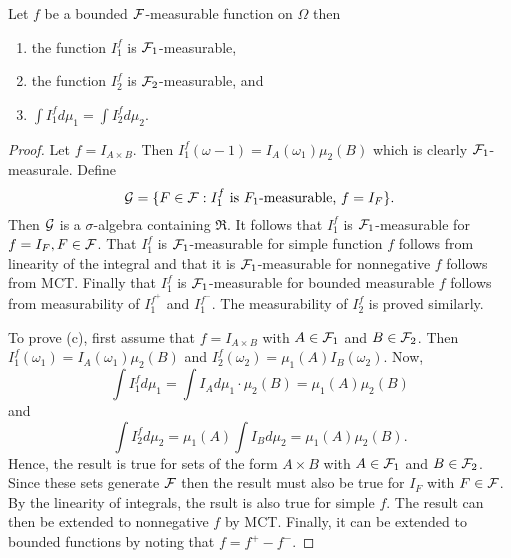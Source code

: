 \begin{lemma}
Let $f$ be a bounded $\mathcal F$-measurable function on $\Omega$ then 
\begin{enumerate}
\item the function $I_1^f$ is $\mathcal F_1$-measurable,
\item the function $I_2^f$ is $\mathcal F_2$-measurable, and
\item $\int I_1^f d\mu_1=\int I_2^f d\mu_2$.
\end{enumerate}
\end{lemma}




\begin{proof}
Let $f=I_{A\times B}$. Then $I_1^f(\omega-1)=I_A(\omega_1)\mu_2(B)$ which is clearly $\mathcal F_1$-measurale. Define
\begin{equation*}
\G=\{F\in\F: I_1^f\ \text{is}\ F_1\text{-measurable,}\ f=I_F \}.
\end{equation*}
Then $\mathcal G$ is a $\sigma$-algebra containing $\Re$. It follows that $I_1^f$ is $\mathcal F_1$-measurable for $f=I_F, F\in\mathcal F$. That $I_1^f$ is $\mathcal F_1$-measurable for simple function $f$ follows from linearity of the integral and that it is $\mathcal F_1$-measurable for nonnegative $f$ follows from MCT. Finally that $I_1^f$ is $\mathcal F_1$-measurable for bounded measurable $f$ follows from measurability of $I_1^{f^+}$ and $I_1^{f^-}$. The measurability of $I_2^f$ is proved similarly.

To prove (c), first assume that $f=I_{A\times B}$ with $A\in\mathcal F_1$ and $B\in\mathcal F_2$. Then $I_1^f(\omega_1)=I_A(\omega_1)\mu_2(B)$ and $I_2^f(\omega_2)=\mu_1(A)I_B(\omega_2)$. Now, 
\begin{equation*}
\int I_1^f d\mu_1 = \int I_A d\mu_1\cdot \mu_2(B)=\mu_1(A)\mu_2(B)
\end{equation*}
and
\begin{equation*}
\int I_2^f d\mu_2=\mu_1(A)\int I_B d\mu_2 = \mu_1(A)\mu_2(B).
\end{equation*}
Hence, the result is true for sets of the form $A\times B$ with $A\in \mathcal F_1$ and $B\in \mathcal F_2$. Since these sets generate $\mathcal F$ then the result must also be true for $I_F$ with $F\in\mathcal F$. By the linearity of integrals, the rsult is also true for simple $f$. The result can then be extended to nonnegative $f$ by MCT. Finally, it can be extended to bounded functions by noting that $f=f^{+}-f^-$.
\end{proof}




